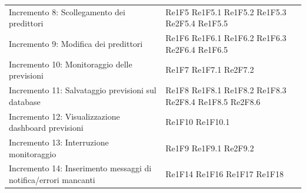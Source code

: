 \begin{longtable}{C{4cm} L{3cm}}
\\
Incremento 8: Scollegamento dei predittori & Re1F5 \newline Re1F5.1 \newline Re1F5.2 \newline Re1F5.3 \newline Re2F5.4 \newline Re1F5.5 
\\
Incremento 9: \newline Modifica dei predittori & Re1F6 \newline Re1F6.1 \newline Re1F6.2 \newline Re1F6.3 \newline Re2F6.4 \newline Re1F6.5
\\
Incremento 10: Monitoraggio delle previsioni & Re1F7 \newline Re1F7.1 \newline Re2F7.2 \newline
\\
Incremento 11: Salvataggio previsioni sul database & Re1F8 \newline  Re1F8.1 \newline Re1F8.2 \newline Re1F8.3 \newline Re2F8.4 \newline Re1F8.5 \newline Re2F8.6
\\
Incremento 12: Visualizzazione dashboard previsioni  & Re1F10 \newline Re1F10.1
\\
Incremento 13: Interruzione monitoraggio & Re1F9 \newline Re1F9.1 \newline Re2F9.2
\\
Incremento 14: Inserimento messaggi di notifica/errori mancanti & Re1F14 \newline Re1F16 \newline Re1F17 \newline Re1F18
\\ 
\end{longtable}
\pagebreak
